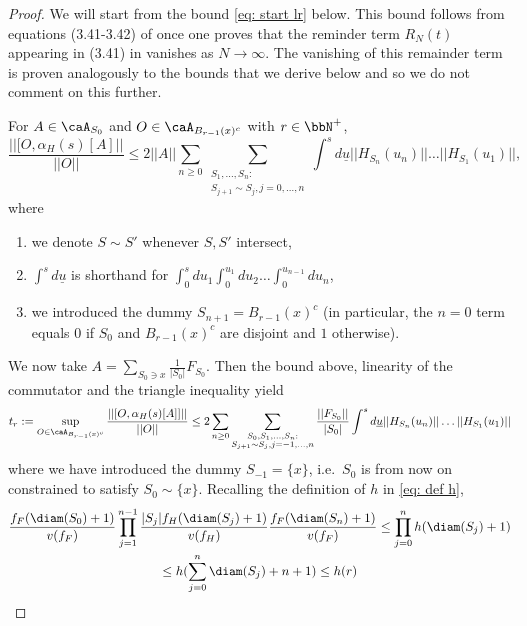 \begin{proof}
	
	We will start from the bound \eqref{eq: start lr} below. This bound follows from equations (3.41-3.42) of \cite{nachtergaele2019quasi} once one proves that the reminder term $R_N(t)$ appearing in (3.41) in \cite{nachtergaele2019quasi} vanishes as $N\to\infty$. The vanishing of this remainder term is proven analogously to the bounds that we derive below and so we do not comment on this further. 
	
	For  $A\in\caA_{S_0}$ and  $O \in \caA_{B_{r-1}(x)^c}$ with $r\in\bbN^+$,
	\begin{equation}\label{eq: start lr}
		\frac{||[O, \alpha_H(s)[A]||}{ || O ||} \leq {2}   || A ||  \sum_{n\geq 0}   \sum_{\substack{
				S_{1},\ldots,S_{n}: \\
				{ S_{j+1} \sim S_{j},  j=0,\ldots,n} }}
		\int^s d\underline{u}
		|| H_{S_n}(u_n)||  \ldots || H_{S_1}(u_1)||,
	\end{equation}
	where \begin{enumerate}
		\item we denote $S\sim S'$ whenever $S,S'$ intersect,
		\item $\int^s d\underline{u}$ is shorthand for $ \int_{0}^s du_1 \int_{0}^{u_1} du_2 \ldots  \int_0^{u_{n-1}} du_n$,
		\item we introduced the dummy $S_{n+1}= B_{r-1}(x)^c$ (in particular, the $n=0$ term equals $0$ if $S_0$ and $B_{r-1}(x)^c$ are disjoint and $1$ otherwise).
	\end{enumerate}
	We now take  $A= \sum_{S_0\ni x} \frac{1}{|S_0|}  F_{S_0}$. Then the bound above, linearity of the commutator and the triangle inequality yield
	$$
	t_r := \sup_{O \in \caA_{B_{r-1}(x)^c}} \frac{||[O,\alpha_H(s)[A]]|| }{|| O ||}\leq 2 \sum_{n\geq 0} 
	\sum_{\substack{
			S_0,S_{1},\ldots,S_{n}: \\
			{ S_{j+1} \sim S_{j},  j=-1,\ldots,n} }}   \frac{ ||F_{S_0}||}{|S_0|} \int^s d\underline{u}
	|| H_{S_n}(u_n)||  \ldots || H_{S_1}(u_1)||
	$$
	where we have introduced the dummy $S_{-1}=\{x\}$, i.e.\ $S_0$ is from now on constrained to satisfy $S_0 \sim \{x\}$.  
	Recalling the definition of $h$ in \eqref{eq: def h}, 
	\begin{multline} \label{eq: use of h}
		\frac{f_F(\diam(S_0)+1)}{v(f_F)} \prod_{j=1}^{n-1}  \frac{|S_j| f_H(\diam(S_j)+1)}{v(f_H)  }\frac{f_F(\diam(S_n)+1)}{v(f_F)}\leq 
		\prod_{j=0}^n h(\diam(S_j)+1) \\ \leq   
		h(\sum_{j=0}^n \diam(S_j)+n+1) \leq h(r)
	\end{multline}

\end{proof}
